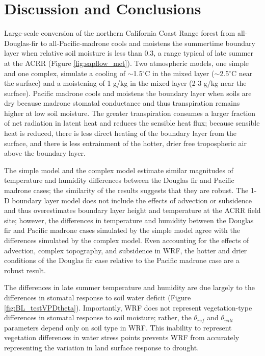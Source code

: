 \section{Discussion and Conclusions}

Large-scale conversion of the northern California Coast Range forest from all-Douglas-fir to all-Pacific-madrone cools and moistens the summertime boundary layer when relative soil moisture is less than 0.3, a range typical of late summer at the ACRR (Figure \ref{fig:sapflow_met}).   Two atmospheric models, one simple and one complex, simulate a cooling of $\sim$1.5$^\circ$C in the mixed layer ($\sim$2.5$^\circ$C near the surface) and a moistening of 1 g/kg in the mixed layer (2-3 g/kg near the surface).  Pacific madrone cools and moistens the boundary layer when soils are dry because madrone stomatal conductance and thus transpiration remains higher at low soil moisture.  The greater transpiration consumes a larger fraction of net radiation in latent heat and reduces the sensible heat flux; because sensible heat is reduced, there is less direct heating of the boundary layer from the surface, and there is less entrainment of the hotter, drier free tropospheric air above the boundary layer.

The simple model and the complex model estimate similar magnitudes of temperature and humidity differences between the Douglas fir and Pacific madrone cases; the similarity of the results suggests that they are robust.  The 1-D boundary layer model does not include the effects of advection or subsidence and thus overestimates boundary layer height and temperature at the ACRR field site; however, the differences in temperature and humidity between the Douglas fir and Pacific madrone cases simulated by the simple model agree with the differences simulated by the complex model.  Even accounting for the effects of advection, complex topography, and subsidence in WRF, the hotter and drier conditions of the Douglas fir case relative to the Pacific madrone case are a robust result.

The differences in late summer temperature and humidity are due largely to the differences in stomatal response to soil water deficit (Figure \ref{fig:BL_testVPDtheta}).  Importantly, WRF does not represent vegetation-type differences in stomatal response to soil moisture; rather, the $\theta_{ref}$ and $\theta_{wilt}$ parameters depend only on soil type in WRF.  This inability to represent vegetation differences in water stress points prevents WRF from accurately representing the variation in land surface response to drought.

